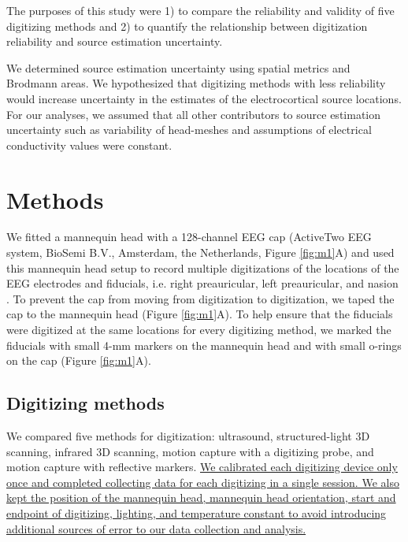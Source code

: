 \documentclass[../thesis_seyed.tex]{subfiles}
\begin{document}
The purposes of this study were 1) to compare the reliability and validity of five digitizing methods and 2) to quantify the relationship between digitization reliability and source estimation uncertainty. We determined source estimation uncertainty using spatial metrics and Brodmann areas.
We hypothesized that digitizing methods with less reliability would increase uncertainty in the estimates of the electrocortical source locations. For our analyses, we assumed that all other contributors to source estimation uncertainty such as variability of head-meshes and assumptions of electrical conductivity values were constant.

\section{Methods}

We fitted a mannequin head with a 128-channel EEG cap (ActiveTwo EEG system, BioSemi B.V., Amsterdam, the Netherlands, Figure \ref{fig:m1}A) and used this mannequin head setup to record multiple digitizations of the locations of the EEG electrodes and fiducials, i.e. right preauricular, left preauricular, and nasion \ul{\cite{Klem1999-ai}}. To prevent the cap from moving from digitization to digitization, we taped the cap to the mannequin head  (Figure \ref{fig:m1}A). To help ensure that the fiducials were digitized at the same locations for every digitizing method, we marked the fiducials with small 4-mm markers on the mannequin head and with small o-rings on the cap (Figure \ref{fig:m1}A).

\subsection{Digitizing methods}
We compared five methods for digitization: ultrasound, structured-light 3D scanning, infrared 3D scanning, motion capture with a digitizing probe, and motion capture with reflective markers. \ul{We calibrated each digitizing device only once and completed collecting data for each digitizing in a single session. We also kept the position of the mannequin head, mannequin head orientation, start and endpoint of digitizing, lighting, and temperature constant to avoid introducing additional sources of error to our data collection and analysis.}
\end{document}
